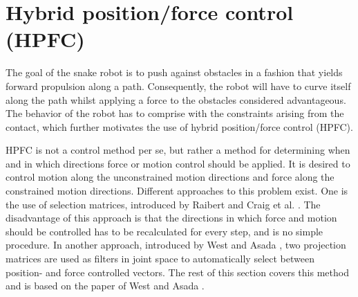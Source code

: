 

\section{Hybrid position/force control (HPFC)}

The goal of the snake robot is to push against obstacles in a fashion that yields forward propulsion along a path. Consequently, the robot will have to curve itself along the path whilst applying a force to the obstacles considered advantageous. The behavior of the robot has to comprise with the constraints arising from the contact, which further motivates the use of hybrid position/force control (HPFC).

HPFC is not a control method per se, but rather a method for determining when and in which directions force or motion control should be applied. It is desired to control motion along the unconstrained motion directions and force along the constrained motion directions. Different approaches to this problem exist. One is the use of selection matrices, introduced by Raibert and Craig et al. \cite{raibert1981hybrid}. The disadvantage of this approach is that the directions in which force and motion should be controlled has to be recalculated for every step, and is no simple procedure. In another approach, introduced by West and Asada \cite{west1985method}, two projection matrices are used as filters in joint space to automatically select between position- and force controlled vectors. The rest of this section covers this method and is based on the paper of West and Asada \cite{west1985method}.

